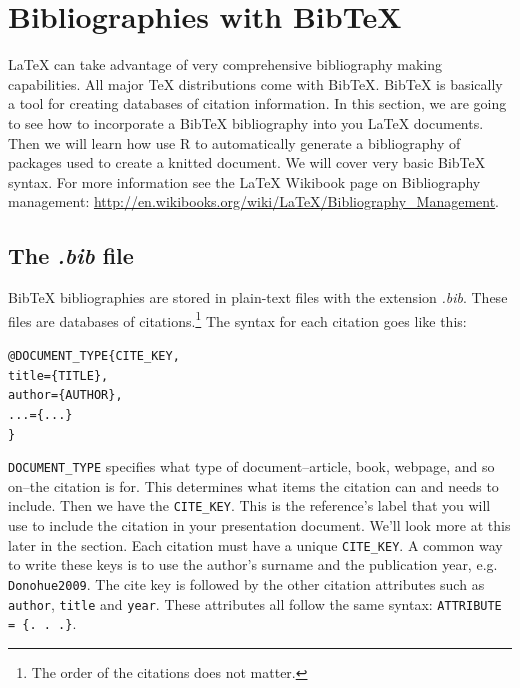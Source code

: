 \section{Bibliographies with BibTeX}\label{BibTeXBib}

LaTeX can take advantage of very comprehensive bibliography making capabilities. All major TeX distributions come with BibTeX. BibTeX is basically a tool for creating databases of citation information. In this section, we are going to see how to incorporate a BibTeX bibliography into you LaTeX documents. Then we will learn how use R to automatically generate a bibliography of packages used to create a knitted document. We will cover very basic BibTeX syntax. For more information see the LaTeX Wikibook page on Bibliography management: \url{http://en.wikibooks.org/wiki/LaTeX/Bibliography_Management}.

\subsection{The \emph{.bib} file}

BibTeX bibliographies are stored in plain-text files with the extension \emph{.bib}. These files are databases of citations.\footnote{The order of the citations does not matter.} The syntax for each citation goes like this:

\begin{knitrout}
    \color{fgcolor}
    \begin{kframe}
        \begin{alltt}
@DOCUMENT_TYPE\{CITE_KEY,
    title = \{TITLE\},
    author = \{AUTHOR\},
    . . . = \{. . .\}
\} 
        \end{alltt}
\end{kframe}
\end{knitrout}

\noindnet \verb|DOCUMENT_TYPE| specifies what type of document--article, book, webpage, and so on--the citation is for. This determines what items the citation can and needs to include. Then we have the \verb|CITE_KEY|. This is the reference's label that you will use to include the citation in your presentation document. We'll look more at this later in the section. Each citation must have a unique \verb|CITE_KEY|. A common way to write these keys is to use the author's surname and the publication year, e.g. \verb|Donohue2009|. The cite key is followed by the other citation attributes such as \texttt{author}, \texttt{title} and \texttt{year}. These attributes all follow the same syntax: \verb|ATTRIBUTE = {. . .}|.

